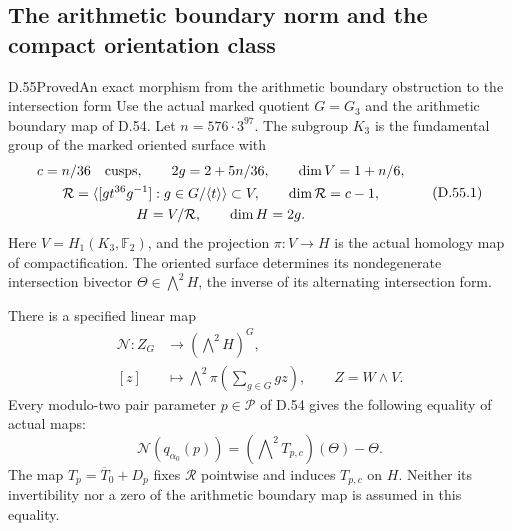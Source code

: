 \subsection{The arithmetic boundary norm and the compact orientation class}

\begin{statement}{D.55}{Proved}{An exact morphism from the arithmetic boundary obstruction to the intersection form}
Use the actual marked quotient \(G=G_3\) and
the arithmetic boundary map of D.54. Let
\(n=576\cdot3^{97}\). The subgroup \(K_3\)
is the fundamental group of the marked
oriented surface with
\[
 \begin{gathered}
 c=n/36\quad\hbox{cusps},\qquad
 2g=2+5n/36,\qquad
 \dim V=1+n/6,\\
 \mathcal R=\langle[g t^{36}g^{-1}]:
                 g\in G/\langle t\rangle\rangle
                 \subset V,\qquad
 \dim\mathcal R=c-1,\\
 H=V/\mathcal R,\qquad \dim H=2g .
 \end{gathered}
 \tag{D.55.1}
\]
Here \(V=H_1(K_3,\mathbb F_2)\), and the
projection \(\pi:V\to H\) is the actual
homology map of compactification.
The oriented surface determines its
nondegenerate intersection bivector
\(\Theta\in\bigwedge^2 H\), the inverse
of its alternating intersection form.

There is a specified linear map
\[
 \begin{aligned}
 \mathcal N:Z_G&\longrightarrow
                      (\bigwedge\nolimits^2H)^G,\\
 [z]&\longmapsto
       \bigwedge\nolimits^2\pi
                      \left(\sum_{g\in G}gz\right),
       \qquad Z=W\wedge V .
 \end{aligned}
 \tag{D.55.2}
\]
Every modulo-two pair parameter \(p\in\mathcal P\)
of D.54 gives the following equality of
actual maps:
\[
 \boxed{\quad
 \mathcal N(q_{\alpha_0}(p))
       =(\bigwedge\nolimits^2 T_{p,c})(\Theta)-\Theta .
       \quad}
 \tag{D.55.3}
\]
The map \(T_p=\overline T_0+D_p\) fixes
\(\mathcal R\) pointwise and induces
\(T_{p,c}\) on \(H\). Neither its
invertibility nor a zero of the arithmetic
boundary map is assumed in this equality.


\end{statement}
